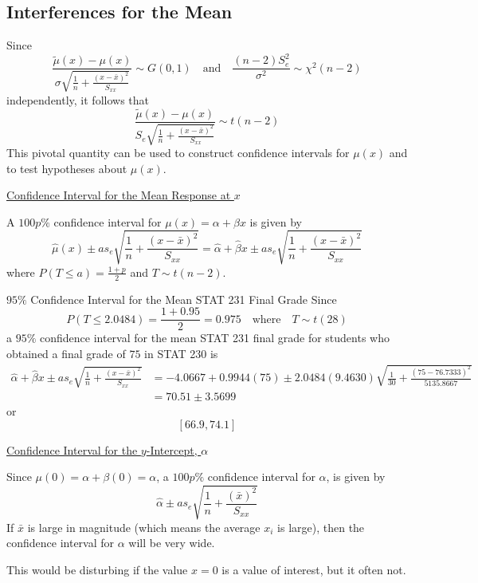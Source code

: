 \documentclass[oneside]{book}
\begin{document}
\subsection{Interferences for the Mean}
Since
\[ \frac{\tilde{\mu}(x)-\mu(x)}{\sigma \sqrt{\frac{1}{n}+\frac{\left( x-\bar{x} \right)^2}{S_{xx}}}}\sim G(0,1)
    \quad\text{and}\quad \frac{(n-2)S_e^2}{\sigma^2}\sim \chi^2(n-2)   \]
independently, it follows that
\[ \frac{\tilde{\mu}(x)-\mu(x)}{S_e \sqrt{\frac{1}{n}+\frac{\left( x-\bar{x} \right)^2}{S_{xx}}}}\sim
    t(n-2) \]
This pivotal quantity can be used to construct confidence intervals for $ \mu(x) $
and to test hypotheses about $ \mu(x) $.

\underline{Confidence Interval for the Mean Response at $ x $}

A $ 100p\% $ confidence interval for $ \mu(x)=\alpha+\beta x $ is given by
\[ \hat{\mu}(x)\pm a s_e\sqrt{\frac{1}{n}+\frac{\left( x-\bar{x} \right)^2}{S_{xx}}}=
    \hat{\alpha}+\hat{\beta}x\pm as_e \sqrt{\frac{1}{n}+\frac{\left( x-\bar{x} \right)^2}{S_{xx}}}\]
where $ P(T\leq a)=\frac{1+p}{2} $ and $ T \sim t(n-2) $.


\begin{Example}{$ 95\% $ Confidence Interval for the Mean STAT 231 Final Grade}{}
    Since
    \[ P(T\leq 2.0484)=\frac{1+0.95}{2}=0.975\quad\text{where}\quad T\sim t(28) \]
    a $ 95\% $ confidence interval for the mean STAT 231 final grade for students who obtained
    a final grade of $ 75 $ in STAT 230 is
    \begin{align*}
        \hat{\alpha}+\hat{\beta} x \pm a s_{e} \sqrt{\frac{1}{n}+\frac{(x-\bar{x})^{2}}{S_{x x}}}
         & =-4.0667+0.9944(75) \pm 2.0484(9.4630) \sqrt{\frac{1}{30}+\frac{(75-76.7333)^{2}}{5135.8667}} \\
         & =70.51 \pm 3.5699
    \end{align*}
    or
    \[ \left[ 66.9,74.1 \right] \]
\end{Example}


\underline{Confidence Interval for the $ y $-Intercept, $ \alpha $}

Since $ \mu(0)=\alpha+\beta(0)=\alpha $, a $ 100p\% $ confidence interval for $ \alpha $,
is given by
\[ \hat{\alpha}\pm as_e\sqrt{\frac{1}{n} +\frac{\left( \bar{x} \right)^2}{S_{xx}} } \]
If $ \bar{x} $ is large in magnitude (which means the average $ x_i $ is large),
then the confidence interval for $ \alpha $ will be very wide.

This would be disturbing if the value $ x=0 $ is a value of interest, but it often not.
\end{document}
